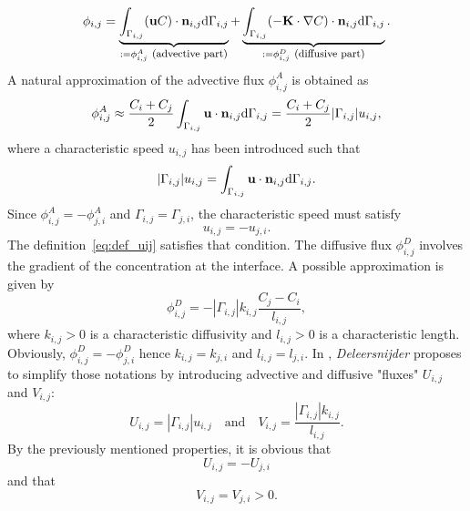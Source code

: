 \begin{equation} \label{eq:phi_i,j}
	\phi_{i,j} = \underbrace{\int_{\Gamma_{i,j}} (\mathbf u C)\cdot \mathbf n_{i,j} \mathrm d\Gamma_{i,j}}_{:= \phi_{i,j}^A \mbox{ \footnotesize (advective part)}} + \underbrace{\int_{\Gamma_{i,j}} (-\mathbf K \cdot \nabla C)\cdot \mathbf n_{i,j} \mathrm d\Gamma_{i,j}}_{:= \phi_{i,j}^D \mbox{ \footnotesize (diffusive part)}}.
\end{equation} 
A natural approximation of the advective flux $\phi_{i,j}^A$ is obtained as
\begin{equation}
	\phi_{i,j}^A \approx \frac{C_i + C_j}{2} \int_{\Gamma_{i,j}} \mathbf u \cdot \mathbf n_{i,j} \mathrm d\Gamma_{i,j} =  \frac{C_i + C_j}{2} |\Gamma_{i,j}| u_{i,j},
\end{equation}
where a characteristic speed $u_{i,j}$ has been introduced such that
\begin{equation} \label{eq:def_uij}
	|\Gamma_{i,j}|u_{i,j} = \int_{\Gamma_{i,j}}\mathbf u \cdot \mathbf n_{i,j} \mathrm d\Gamma_{i,j}.
\end{equation}
Since $\phi_{i,j}^A = - \phi_{j,i}^A$ and $\Gamma_{i,j} = \Gamma_{j,i}$, the characteristic speed must satisfy
\begin{equation}
	u_{i,j} = - u_{j,i}.
\end{equation}
The definition~\eqref{eq:def_uij} satisfies that condition.
The diffusive flux $\phi_{i,j}^D$ involves the gradient of the concentration at the interface. A possible approximation is given by
\begin{equation}
	\phi_{i,j}^D = - |\Gamma_{i,j}| k_{i,j} \frac{C_j-C_i}{l_{i,j}},
\end{equation}
where $k_{i,j} > 0$ is a characteristic diffusivity and $l_{i,j} > 0$ is a characteristic length. Obviously, $\phi_{i,j}^D = -\phi_{j,i}^D$ hence $k_{i,j} = k_{j,i}$ and $l_{i,j} = l_{j,i}$. In \cite{deleersnijder2014compartment}, \textit{Deleersnijder} proposes to simplify those notations by introducing advective and diffusive "fluxes" $U_{i,j}$ and $V_{i,j}$:
\begin{equation} \label{eq:def_Uij_Vij}
	U_{i,j} = |\Gamma_{i,j}|u_{i,j} \quad \mbox{and} \quad V_{i,j} = \frac{|\Gamma_{i,j}|k_{i,j}}{l_{i,j}}.
\end{equation}
By the previously mentioned properties, it is obvious that 
\begin{equation} \label{eq:Uprop}
	U_{i,j} = -U_{j,i}
\end{equation} 
and that 
\begin{equation} \label{eq:Vprop}
	V_{i,j} = V_{j,i} > 0.
\end{equation}
